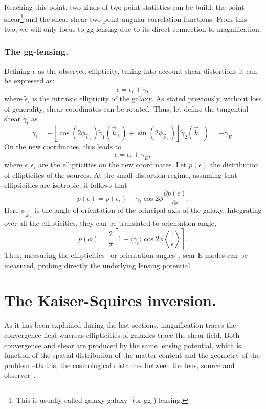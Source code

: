 Reaching this point, two kinds of two-point statistics can be build: the point-shear\footnote{This is usually called galaxy-galaxy- (or gg-) lensing.} and the shear-shear two-point angular-correlation functions. From this two, we will only focus to gg-lensing due to its direct connection to magnification.

\subsubsection{The gg-lensing.}
Defining $\tilde\epsilon$ as the observed ellipticity, taking into account shear distortions it can be expressed as:
\begin{equation}
\tilde\epsilon = \tilde\epsilon_i + \tilde\gamma,
\end{equation}
where $\tilde\epsilon_i$ is the intrinsic ellipticity of the galaxy. As stated previously, without loss of generality, shear coordinates can be rotated.  Thus, let define the tangential shear $\gamma_t$ as
\begin{equation}
\gamma_t = -[\cos(2\phi_{\vec k_\perp})\tilde \gamma_1(\vec k_\perp)+\sin(2\phi_{\vec k_\perp})]\tilde \gamma_2(\vec k_\perp) = -\gamma_E.
\end{equation}
On the new coordinates, this leads to
\begin{equation}
\epsilon = \epsilon_i+\gamma_E,
\end{equation}
where $\tilde\epsilon,\tilde\epsilon_i$ are the ellipticities on the new coordinates. Let $p(\epsilon)$ the distribution of ellipticites of the sources.  At the small distortion regime, assuming that ellipticities are isotropic, it follows that
\begin{equation}
p(\epsilon) = p(\epsilon_i)+\gamma_t\cos2\phi\frac{\partial p(\epsilon)}{\partial \epsilon}.
\end{equation}
Here $\phi_{\vec k_\perp}$ is the angle of orientation of the principal axis of the galaxy. Integrating over all the ellipticities, they can be translated to orientation angle,
\begin{equation}
p(\phi) = \frac{2}{\pi}\left[1-\langle\gamma_t\rangle\cos2\phi\left\langle\frac1{\epsilon}\right\rangle\right].
\end{equation}
Thus, measuring the ellipticities --or orientation angles--, sear E-modes can be measured, probing directly the underlying lensing potential.

\section{The Kaiser-Squires inversion.}
As it has been explained during the last sections, magnification traces the convergence field whereas ellipticities of galaxies trace the shear field. Both convergence and shear are produced by the same lensing potential, which is function of the spatial distribution of the matter content and the geometry of the problem --that is, the cosmological distances between the lens, source and observer--.
\newline

